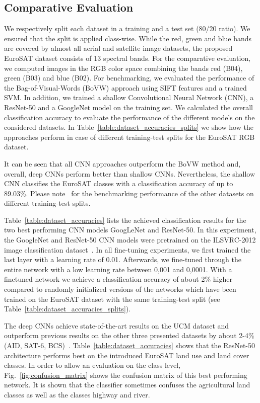 \documentclass[journal]{IEEEtran}
\begin{document}
\subsection{Comparative Evaluation}

We respectively split each dataset in a training and a test set (80/20 ratio). We ensured that the split is applied class-wise. While the red, green and blue bands are covered by almost all aerial and satellite image datasets, the proposed EuroSAT dataset consists of 13 spectral bands. For the comparative evaluation, we computed images in the RGB color space combining the bands red (B04), green (B03) and blue (B02). For benchmarking, we evaluated the performance of the Bag-of-Visual-Words (BoVW) approach using SIFT features and a trained SVM. In addition, we trained a shallow Convolutional Neural Network (CNN), a ResNet-50 and a GoogleNet model on the training set. We calculated the overall classification accuracy to evaluate the performance of the different models on the considered datasets. In Table~\ref{table:dataset_accuracies_splits} we show how the approaches perform in case of different training-test splits for the EuroSAT RGB dataset.

It can be seen that all CNN approaches outperform the BoVW method and, overall, deep CNNs perform better than shallow CNNs. Nevertheless, the shallow CNN classifies the EuroSAT classes with a classification accuracy of up to 89.03\%. Please note~\cite{castelluccio2015land, nogueira2017towards, sheng2012high} for the benchmarking performance of the other datasets on different training-test splits.

Table~\ref{table:dataset_accuracies} lists the achieved classification results for the two best performing CNN models GoogLeNet and ResNet-50. In this experiment, the GoogleNet and ResNet-50 CNN models were pretrained on the ILSVRC-2012 image classification dataset~\cite{ILSVRC15}. In all fine-tuning experiments, we first trained the last layer with a learning rate of 0.01. Afterwards, we fine-tuned through the entire network with a low learning rate between 0,001 and 0,0001. With a finetuned network we achieve a classification accuracy of about 2\% higher compared to randomly initialized versions of the networks which have been trained on the EuroSAT dataset with the same training-test split (see Table~\ref{table:dataset_accuracies_splits}).

The deep CNNs achieve state-of-the-art results on the UCM dataset and outperform previous results on the other three presented datasets by about 2-4\% (AID, SAT-6, BCS)~\cite{castelluccio2015land, nogueira2017towards, sheng2012high}. Table~\ref{table:dataset_accuracies} shows that the ResNet-50 architecture performs best on the introduced EuroSAT land use and land cover classes. In order to allow an evaluation on the class level, Fig.~\ref{fig:confusion_matrix} shows the confusion matrix of this best performing network. It is shown that the classifier sometimes confuses the agricultural land classes as well as the classes highway and river.
\end{document}
